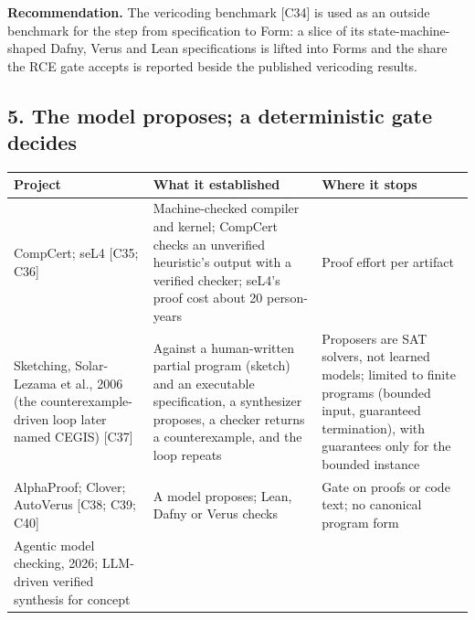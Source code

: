 \documentclass[10pt,letterpaper]{article}
\begin{document}
\textbf{Recommendation.} The vericoding benchmark {[}C34{]} is used as
an outside benchmark for the step from specification to Form: a slice of
its state-machine-shaped Dafny, Verus and Lean specifications is lifted
into Forms and the share the RCE gate accepts is reported beside the
published vericoding results.

\subsection{5. The model proposes; a deterministic gate
decides}\label{the-model-proposes-a-deterministic-gate-decides}

{\footnotesize\setlength{\tabcolsep}{3.8pt}\renewcommand{\arraystretch}{1.15}
\begin{longtable}[]{@{}
  >{\raggedright\arraybackslash}p{}
  >{\raggedright\arraybackslash}p{}
  >{\raggedright\arraybackslash}p{}@{}}
\toprule\noalign{}
\begin{minipage}[b]{\linewidth}\raggedright
\textbf{Project}
\end{minipage} & \begin{minipage}[b]{\linewidth}\raggedright
\textbf{What it established}
\end{minipage} & \begin{minipage}[b]{\linewidth}\raggedright
\textbf{Where it stops}
\end{minipage} \\
\midrule\noalign{}
\endhead
\bottomrule\noalign{}
\endlastfoot
CompCert; seL4 {[}C35; C36{]} & Machine-checked compiler and kernel;
CompCert checks an unverified heuristic's output with a verified
checker; seL4's proof cost about 20 person-years & Proof effort per
artifact \\
Sketching, Solar-Lezama et al., 2006 (the counterexample-driven loop
later named CEGIS) {[}C37{]} & Against a human-written partial program
(sketch) and an executable specification, a synthesizer proposes, a
checker returns a counterexample, and the loop repeats & Proposers are
SAT solvers, not learned models; limited to finite programs (bounded
input, guaranteed termination), with guarantees only for the bounded
instance \\
AlphaProof; Clover; AutoVerus {[}C38; C39; C40{]} & A model proposes;
Lean, Dafny or Verus checks & Gate on proofs or code text; no canonical
program form \\
Agentic model checking, 2026; LLM-driven verified synthesis for concept

\end{longtable}}
\end{document}
